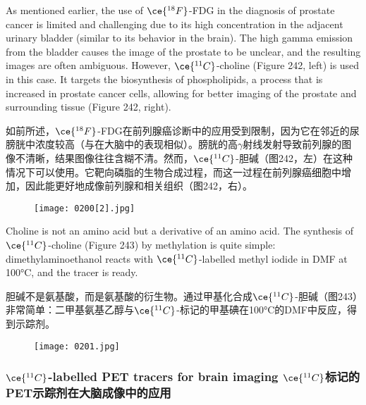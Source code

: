 \documentclass[dvipsnames, svgnames,a4paper,11pt]{article}
\begin{document}
As mentioned earlier, the use of \(\ce{^{18}F}\)-FDG in the diagnosis of prostate cancer is limited and challenging due to its high concentration in the adjacent urinary bladder (similar to its behavior in the brain). The high gamma emission from the bladder causes the image of the prostate to be unclear, and the resulting images are often ambiguous. However, \(\ce{^{11}C}\)-choline (Figure 242, left) is used in this case. It targets the biosynthesis of phospholipids, a process that is increased in prostate cancer cells, allowing for better imaging of the prostate and surrounding tissue (Figure 242, right).

如前所述，\(\ce{^{18}F}\)-FDG在前列腺癌诊断中的应用受到限制，因为它在邻近的尿膀胱中浓度较高（与在大脑中的表现相似）。膀胱的高$\gamma$射线发射导致前列腺的图像不清晰，结果图像往往含糊不清。然而，\(\ce{^{11}C}\)-胆碱（图242，左）在这种情况下可以使用。它靶向磷脂的生物合成过程，而这一过程在前列腺癌细胞中增加，因此能更好地成像前列腺和相关组织（图242，右）。

\begin{figure}[h]
	\centering
    \texttt{[image: 0200[2].jpg]}  
     \label{fig242}
\end{figure}


Choline is not an amino acid but a derivative of an amino acid. The synthesis of \(\ce{^{11}C}\)-choline (Figure 243) by methylation is quite simple: dimethylaminoethanol reacts with \(\ce{^{11}C}\)-labelled methyl iodide in DMF at 100°C, and the tracer is ready.

胆碱不是氨基酸，而是氨基酸的衍生物。通过甲基化合成\(\ce{^{11}C}\)-胆碱（图243）非常简单：二甲基氨基乙醇与\(\ce{^{11}C}\)-标记的甲基碘在100°C的DMF中反应，得到示踪剂。

\begin{figure}[h]
	\centering
    \texttt{[image: 0201.jpg]}  
     \label{fig243}
\end{figure}

\subsubsection{\(\ce{^{11}C}\)-labelled PET tracers for brain imaging \(\ce{^{11}C}\)标记的PET示踪剂在大脑成像中的应用}  
\end{document}
